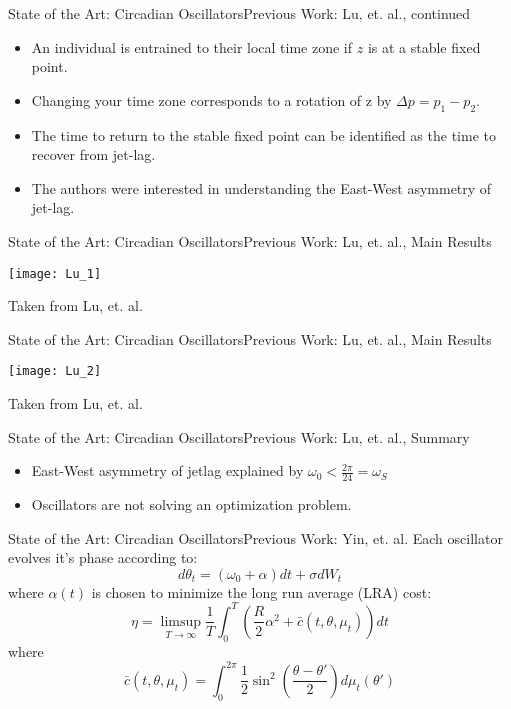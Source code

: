 \documentclass{beamer}
\begin{document}
\begin{frame}{State of the Art: Circadian Oscillators}{Previous Work: Lu, et. al., continued}
	\begin{itemize}
		\item An individual is entrained to their local time zone if $z$ is at a stable fixed point.
		\item Changing your time zone corresponds to a rotation of z by $\Delta p=p_1-p_2$.
		\item The time to return to the stable fixed point can be identified as the time to recover from jet-lag.
		\item The authors were interested in understanding the East-West asymmetry of jet-lag.
	\end{itemize}
\end{frame}

\begin{frame}{State of the Art: Circadian Oscillators}{Previous Work: Lu, et. al., Main Results}
	\begin{center}
	\texttt{[image: Lu\_1]}
	\end{center}
	Taken from Lu, et. al.
\end{frame}

\begin{frame}{State of the Art: Circadian Oscillators}{Previous Work: Lu, et. al., Main Results}
	\begin{center}
		\texttt{[image: Lu\_2]}
	\end{center}
	Taken from Lu, et. al.
\end{frame}

\begin{frame}{State of the Art: Circadian Oscillators}{Previous Work: Lu, et. al., Summary}
	\begin{itemize}
		\item East-West asymmetry of jetlag explained by $\omega_0<\frac{2 \pi}{24}=\omega_S$
		\item Oscillators are not solving an optimization problem.
	\end{itemize}
\end{frame}

\begin{frame}{State of the Art: Circadian Oscillators}{Previous Work: Yin, et. al.}
		Each oscillator evolves it's phase according to:
		\begin{equation}
			d\theta_t=(\omega_0+\alpha)dt+\sigma dW_t
		\end{equation}
		where $\alpha(t)$ is chosen to minimize the long run average (LRA) cost:
		\begin{equation}
		\eta=\limsup_{T \rightarrow \infty} \frac{1}{T}\int_0^T \left(\frac{R}{2} \alpha^2+\bar{c}(t,\theta,\mu_t) \right) dt
		\end{equation}
		where
		\begin{equation}
		\bar{c}(t,\theta,\mu_t)=\int_0^{2\pi}\frac{1}{2}\sin^2\left(\frac{\theta-\theta'}{2}\right) d\mu_t(\theta')
		\end{equation}
\end{frame}
\end{document}
